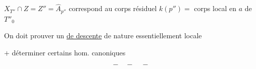 $X_{T''}\cap Z=Z''=\widehat A_{p''}$ correspond au corps
résiduel $k(p'')={}$ corps local en $a$ de $T''_0$

On doit prouver un \uline{ de descente}
de nature essentiellement locale

$+$ déterminer certains hom. canoniques

\[
-\quad-\quad-
\]

